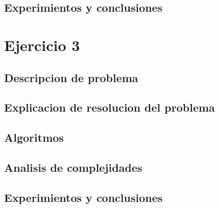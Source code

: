 \documentclass[12pt, a4paper]{article}
\begin{document}
\subsection{Experimientos y conclusiones}


\section{Ejercicio 3} 
\subsection{Descripcion de problema}

\subsection{Explicacion de resolucion del problema}

\subsection{Algoritmos}

\subsection{Analisis de complejidades}

\subsection{Experimientos y conclusiones}

\end{document}
